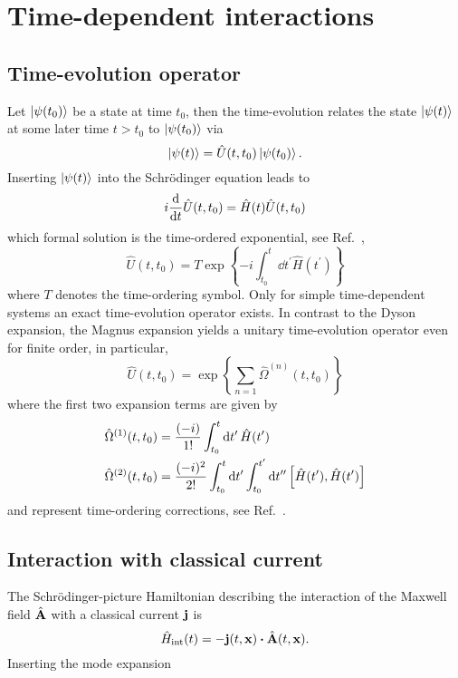 \section{Time-dependent interactions}

\subsection{Time-evolution operator}

Let $\ket{\psi(t_0)}$ be a state at time $t_0$, then the time-evolution relates the state $\ket{\psi(t)}$ at some later time $t>t_0$ to $\ket{\psi(t_0)}$ via
\begin{equation}
	\ket{\psi(t)}
	=
	\hat{U}(t,t_0)
	\ket{\psi(t_0)}
	.
\end{equation}
Inserting $\ket{\psi(t)}$ into the Schrödinger equation leads to
\begin{equation}
	i\dv{t}
	\hat{U}(t,t_0)
	=
	\hat{H}(t)
	\hat{U}(t,t_0)
\end{equation}
which formal solution is the time-ordered exponential, see Ref.~\cite[p.~380]{Bartelmann2018},
\begin{equation}
	\hat{U}(t,t_0)
	=
	T\exp\left\{
		-i
		\int_{t_0}^t\dd{t^\prime}
		\hat{H}(t^\prime)
	\right\}
\end{equation}
where $T$ denotes the time-ordering symbol.
Only for simple time-dependent systems an exact time-evolution operator exists.
In contrast to the Dyson expansion, the Magnus expansion yields a unitary time-evolution operator even for finite order, in particular,
\begin{equation}
	\hat{U}(t,t_0)
	=
	\exp\left\{
		\sum_{n=1}
		\hat{\Omega}^{(n)}(t,t_0)
	\right\}
\end{equation}
where the first two expansion terms are given by
\begin{align}
	\hat{\Omega}^{(1)}(t,t_0)
	&=
	\frac{(-i)}{1!}
	\int_{t_0}^t\dd{t^\prime}
	\hat{H}(t^\prime)
	\\
	\hat{\Omega}^{(2)}(t,t_0)
	&=
	\frac{(-i)^2}{2!}
	\int_{t_0}^t\dd{t^\prime}
	\int_{t_0}^{t^\prime}\dd{t^{\prime\prime}}
	\comm{\hat{H}(t^\prime)}{\hat{H}(t^\prime)}
\end{align}
and represent time-ordering corrections, see Ref.~\cite{QuesadaMejia2015}.

\subsection{Interaction with classical current}

The Schrödinger-picture Hamiltonian describing the interaction of the Maxwell field $\hat{\vb{A}}$ with a classical current $\vb{j}$ is
\begin{equation}
	\hat{H}_\text{int}(t)
	=
	-
	\vb{j}(t,\vb{x})
	\vdot
	\hat{\vb{A}}(t,\vb{x})
	.
\end{equation}
Inserting the mode expansion